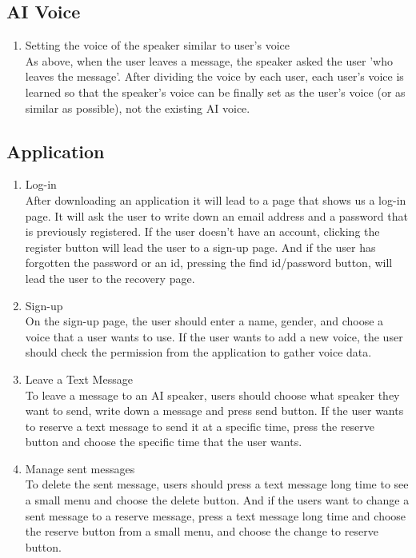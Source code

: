 \documentclass[conference]{IEEEtran}
\begin{document}
\subsection{AI Voice}
\begin{enumerate}
    \item Setting the voice of the speaker similar to user's voice\\
    As above, when the user leaves a message, the speaker asked the user 'who leaves the message'. After dividing the voice by each user, each user's voice is learned so that the speaker's voice can be finally set as the user's voice (or as similar as possible), not the existing AI voice.\\
\end{enumerate}

\subsection{Application}
\begin{enumerate}
    \item Log-in\\
    After downloading an application it will lead to a page that shows us a log-in page. It will ask the user to write down an email address and a password that is previously registered. If the user doesn't have an account, clicking the register button will lead the user to a sign-up page. And if the user has forgotten the password or an id, pressing the find id/password button, will lead the user to the recovery page.\\
    \item Sign-up\\
    On the sign-up page, the user should enter a name, gender, and choose a voice that a user wants to use. If the user wants to add a new voice, the user should check the permission from the application to gather voice data.\\
    \item Leave a Text Message\\
    To leave a message to an AI speaker, users should choose what speaker they want to send, write down a message and press send button. If the user wants to reserve a text message to send it at a specific time, press the reserve button and choose the specific time that the user wants.\\
    \item Manage sent messages\\
    To delete the sent message, users should press a text message long time to see a small menu and choose the delete button. And if the users want to change a sent message to a reserve message, press a text message long time and choose the reserve button from a small menu, and choose the change to reserve button.\\
\end{enumerate}
\end{document}
